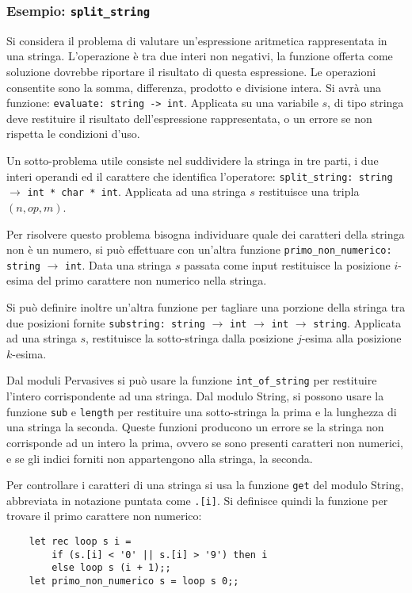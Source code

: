 \documentclass{article}
\numberwithin{equation}{subsection}
\begin{document}
\subsubsection*{Esempio: \texttt{split\_string}}

Si considera il problema di valutare un'espressione aritmetica rappresentata in una stringa. L'operazione è tra due interi non negativi, la funzione offerta come soluzione dovrebbe riportare il risultato di questa espressione. Le operazioni consentite sono la somma, differenza, prodotto e divisione intera. 
Si avrà una funzione: \verb|evaluate: string -> int|. Applicata su una variabile $s$, di tipo stringa deve restituire il risultato dell'espressione rappresentata, o un errore se non rispetta le condizioni d'uso. 

Un sotto-problema utile consiste nel suddividere la stringa in tre parti, i due interi operandi ed il carattere che identifica l'operatore: \verb|split_string: string| $\rightarrow$ \verb|int * char * int|. Applicata ad una stringa $s$ restituisce una tripla $(n,op,m)$. 

Per risolvere questo problema bisogna individuare quale dei caratteri della stringa non è un numero, si può effettuare con un'altra funzione \verb|primo_non_numerico: string| $\rightarrow$ \verb|int|. Data una stringa $s$ passata come input restituisce la posizione $i$-esima del primo carattere non numerico nella stringa. 

Si può definire inoltre un'altra funzione per tagliare una porzione della stringa tra due posizioni fornite \verb|substring: string| $\rightarrow$ \verb|int| $\rightarrow$ \verb|int| $\rightarrow$ \verb|string|. Applicata ad una stringa $s$, restituisce la sotto-stringa dalla posizione $j$-esima alla posizione $k$-esima. 

Dal moduli Pervasives si può usare la funzione \verb|int_of_string| per restituire l'intero corrispondente ad una stringa. Dal modulo String, si possono usare la funzione \verb|sub| e \verb|length| per restituire una sotto-stringa la prima e la lunghezza di una stringa la seconda. 
Queste funzioni producono un errore se la stringa non corrisponde ad un intero la prima, ovvero se sono presenti caratteri non numerici, e se gli indici forniti non appartengono alla stringa, la seconda. 

Per controllare i caratteri di una stringa si usa la funzione \verb|get| del modulo String, abbreviata in notazione puntata come \verb|.[i]|. Si definisce quindi la funzione per trovare il primo carattere non numerico:
\begin{verbatim}
    let rec loop s i = 
        if (s.[i] < '0' || s.[i] > '9') then i
        else loop s (i + 1);;
    let primo_non_numerico s = loop s 0;;
\end{verbatim}
\end{document}
